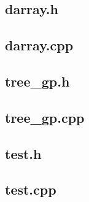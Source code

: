 \documentclass[12pt]{article}
\begin{document}
\subsection{darray.h}


\subsection{darray.cpp}


\subsection{tree\_gp.h}


\subsection{tree\_gp.cpp}
\label{sec:tree-gp.cpp}


\subsection{test.h}


\subsection{test.cpp}

\end{document}
